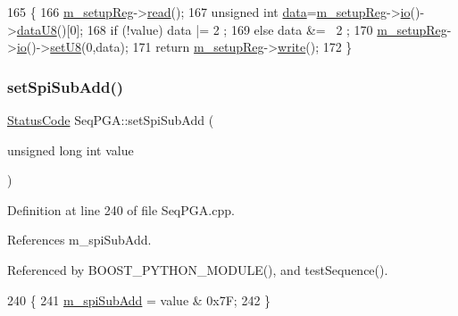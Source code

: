 \begin{DoxyCode}
165                                            \{
166   \hyperlink{classSeqPGA_a03269241e7fc26493cd0595beda334c2}{m\_setupReg}->\hyperlink{classIOobject_aa07610c11963b1db6710e3c76ceea456}{read}();
167   \textcolor{keywordtype}{unsigned} \textcolor{keywordtype}{int} \hyperlink{namespaceshell_a5ea2525995cedc3efd69ea8a7f034d1e}{data}=\hyperlink{classSeqPGA_a03269241e7fc26493cd0595beda334c2}{m\_setupReg}->\hyperlink{classIOobject_af04fb94137c3d86849f478ac5afab5d1}{io}()->\hyperlink{classIOdata_a75e9c318dbac3a39402179070943d4bc}{dataU8}()[0];
168   \textcolor{keywordflow}{if} (!value) data |=  2 ;
169   \textcolor{keywordflow}{else}        data &= ~2 ;
170   \hyperlink{classSeqPGA_a03269241e7fc26493cd0595beda334c2}{m\_setupReg}->\hyperlink{classIOobject_af04fb94137c3d86849f478ac5afab5d1}{io}()->\hyperlink{classIOdata_a6c4fb2f2af01889ada889c2b7aceb24d}{setU8}(0,data);
171   \textcolor{keywordflow}{return} \hyperlink{classSeqPGA_a03269241e7fc26493cd0595beda334c2}{m\_setupReg}->\hyperlink{classIOobject_a9f6984bc9f0fadcf800f1be2523ac744}{write}();
172 \}
\end{DoxyCode}
\mbox{\label{classSeqPGA_a5db205f213770dd3fb3fcfb8ff7981df}} 
\subsubsection{\texorpdfstring{set\+Spi\+Sub\+Add()}{setSpiSubAdd()}}
{\footnotesize\ttfamily \hyperlink{classStatusCode}{Status\+Code} Seq\+P\+G\+A\+::set\+Spi\+Sub\+Add (\begin{DoxyParamCaption}\item[{unsigned long int}]{value }\end{DoxyParamCaption})}



Definition at line 240 of file Seq\+P\+G\+A.\+cpp.



References m\+\_\+spi\+Sub\+Add.



Referenced by B\+O\+O\+S\+T\+\_\+\+P\+Y\+T\+H\+O\+N\+\_\+\+M\+O\+D\+U\+L\+E(), and test\+Sequence().


\begin{DoxyCode}
240                                                         \{
241   \hyperlink{classSeqPGA_afd5442d9b92f9b59bd553df9bd91dd87}{m\_spiSubAdd} = value & 0x7F;
242 \}
\end{DoxyCode}
\mbox{\label{classObject_a89557dbbad5bcaa02652f5d7fa35d20f}} 
